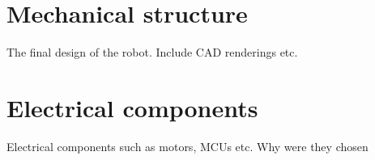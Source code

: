 \section*{Mechanical structure}
The final design of the robot. Include CAD renderings etc. 
\section*{Electrical components}
Electrical components such as motors, MCUs etc. Why were they chosen